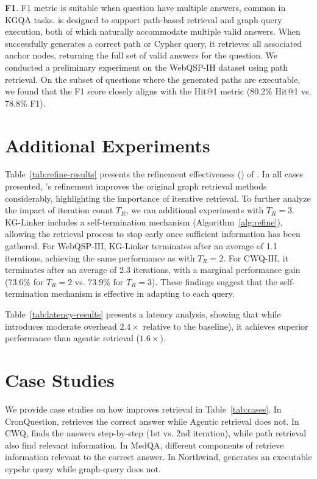 \textbf{F1}. F1 metric is suitable when question have multiple answers, common in KGQA tasks. \byokg is designed to support path-based retrieval and graph query execution, both of which naturally accommodate multiple valid answers. When \byokg successfully generates a correct path or Cypher query, it retrieves all associated anchor nodes, returning the full set of valid answers for the question.
We conducted a preliminary experiment on the WebQSP-IH dataset using path retrieval. On the subset of questions where the generated paths are executable, we found that the F1 score closely aligns with the Hit@1 metric (80.2\% Hit@1 vs. 78.8\% F1).

\section{Additional Experiments}
\label{app:exps}



Table~\ref{tab:refine-results} presents the refinement effectiveness () of \byokg. In all cases presented, \byokg's  refinement improves the original graph retrieval methods considerably, highlighting the importance of iterative retrieval. To further analyze the impact of iteration count $T_R$, we ran additional experiments with 
$T_R=3$. KG-Linker includes a self-termination mechanism (Algorithm~\ref{alg:refine}), allowing the retrieval process to stop early once sufficient information has been gathered. For WebQSP-IH, KG-Linker terminates after an average of 1.1 iterations, achieving the same performance as with 
$T_R=2$. For CWQ-IH, it terminates after an average of 2.3 iterations, with a marginal performance gain (73.6\% for 
$T_R=2$ vs. 73.9\% for 
$T_R=3$). These findings suggest that the self-termination mechanism is effective in adapting to each query.



Table~\ref{tab:latency-results} presents a latency analysis, showing that while \byokg introduces moderate overhead $2.4\times$ relative to the baseline), it achieves superior performance than agentic retrieval ($1.6\times$).

\section{Case Studies}
\label{app:case}


We provide case studies on how \byokg improves retrieval in Table~\ref{tab:cases}. In CronQuestion, \byokg retrieves the correct answer while Agentic retrieval does not. In CWQ, \byokg finds the answers step-by-step (1st vs. 2nd iteration), while path retrieval also find relevant information. In MedQA, different components of \byokg retrieve information relevant to the correct answer. In Northwind, \byokg generates an executable cypehr query while graph-query does not. 



